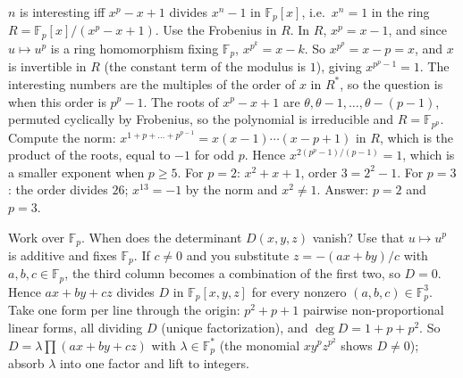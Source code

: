\documentclass[11pt,a4paper]{article}
\begin{document}
 $n$ is interesting iff $x^p-x+1$ divides $x^n-1$ in $\mathbb{F}_p[x]$, i.e.\ $x^n=1$ in the ring $R=\mathbb{F}_p[x]/(x^p-x+1)$. Use the Frobenius in $R$.
 In $R$, $x^p=x-1$, and since $u\mapsto u^p$ is a ring homomorphism fixing $\mathbb{F}_p$, $x^{p^k}=x-k$. So $x^{p^p}=x-p=x$, and $x$ is invertible in $R$ (the constant term of the modulus is $1$), giving $x^{p^p-1}=1$.
 The interesting numbers are the multiples of the order of $x$ in $R^*$, so the question is when this order is $p^p-1$. The roots of $x^p-x+1$ are $\theta,\theta-1,\dots,\theta-(p-1)$, permuted cyclically by Frobenius, so the polynomial is irreducible and $R=\mathbb{F}_{p^p}$.
 Compute the norm: $x^{1+p+\dots+p^{p-1}}=x(x-1)\cdots(x-p+1)$ in $R$, which is the product of the roots, equal to $-1$ for odd $p$. Hence $x^{2(p^p-1)/(p-1)}=1$, which is a smaller exponent when $p\ge5$.
 For $p=2$: $x^2+x+1$, order $3=2^2-1$. For $p=3$: the order divides $26$; $x^{13}=-1$ by the norm and $x^2\ne1$. Answer: $p=2$ and $p=3$.

 Work over $\mathbb{F}_p$. When does the determinant $D(x,y,z)$ vanish? Use that $u\mapsto u^p$ is additive and fixes $\mathbb{F}_p$.
 If $c\ne0$ and you substitute $z=-(ax+by)/c$ with $a,b,c\in\mathbb{F}_p$, the third column becomes a combination of the first two, so $D=0$. Hence $ax+by+cz$ divides $D$ in $\mathbb{F}_p[x,y,z]$ for every nonzero $(a,b,c)\in\mathbb{F}_p^3$.
 Take one form per line through the origin: $p^2+p+1$ pairwise non-proportional linear forms, all dividing $D$ (unique factorization), and $\deg D=1+p+p^2$. So $D=\lambda\prod(ax+by+cz)$ with $\lambda\in\mathbb{F}_p^*$ (the monomial $xy^pz^{p^2}$ shows $D\ne0$); absorb $\lambda$ into one factor and lift to integers.
\end{document}
